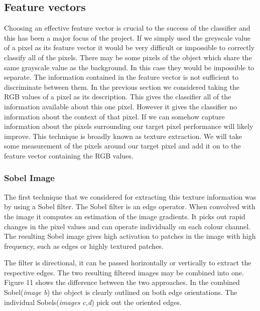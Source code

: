 \documentclass[12pt]{IIBproject}
\begin{document}
\subsection{Feature vectors}
Choosing an effective feature vector is crucial to the success of the classifier and this has been a major focus of the project. If we simply used the greyscale value of a pixel as its feature vector it would be very difficult or impossible to correctly classify all of the pixels. There may be some pixels of the object which share the same grayscale value as the background. In this case they would be impossible to separate. The information contained in the feature vector is not sufficient to discriminate between them. In the previous section we considered taking the RGB values of a pixel as its description. This gives the classifier all of the information available about this one pixel. However it gives the classifier no information about the context of that pixel. If we can somehow capture information about the pixels surrounding our target pixel performance will likely improve. This technique is broadly known as texture extraction. We will take some measurement of the pixels around our target pixel and add it on to the feature vector containing the RGB values.

\subsubsection{Sobel Image}

 The first technique that we considered for extracting this texture information was by using a Sobel filter\cite{chaple2014design}. The Sobel filter is an edge operator. When convolved with the image it computes an estimation of the image gradients. It picks out rapid changes in the pixel values and can operate individually on each colour channel. The resulting Sobel image gives high activation to patches in the image with high frequency, such as edges or highly textured patches.
 
 The filter is directional, it can be passed horizontally or vertically to extract the respective edges. The two resulting filtered images may be combined into one. Figure 11 shows the difference between the two approaches. In the combined Sobel(\emph{image b}) the object is clearly outlined on both edge orientations. The individual Sobels(\emph{images c,d}) pick out the oriented edges. 
\end{document}
